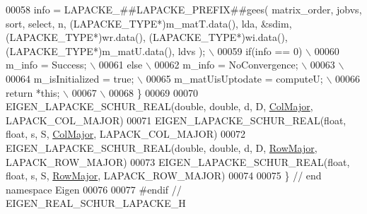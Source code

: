 \begin{DoxyCode}
00058 \textcolor{preprocessor}{  info = LAPACKE\_##LAPACKE\_PREFIX##gees( matrix\_order, jobvs, sort, select, n,
       (LAPACKE\_TYPE*)m\_matT.data(), lda, &sdim, (LAPACKE\_TYPE*)wr.data(), (LAPACKE\_TYPE*)wi.data(), (LAPACKE\_TYPE*)m\_matU.data(), ldvs ); \(\backslash\)}
00059 \textcolor{preprocessor}{  if(info == 0) \(\backslash\)}
00060 \textcolor{preprocessor}{    m\_info = Success; \(\backslash\)}
00061 \textcolor{preprocessor}{  else \(\backslash\)}
00062 \textcolor{preprocessor}{    m\_info = NoConvergence; \(\backslash\)}
00063 \textcolor{preprocessor}{\(\backslash\)}
00064 \textcolor{preprocessor}{  m\_isInitialized = true; \(\backslash\)}
00065 \textcolor{preprocessor}{  m\_matUisUptodate = computeU; \(\backslash\)}
00066 \textcolor{preprocessor}{  return *this; \(\backslash\)}
00067 \textcolor{preprocessor}{\(\backslash\)}
00068 \textcolor{preprocessor}{\}}
00069 
00070 EIGEN\_LAPACKE\_SCHUR\_REAL(\textcolor{keywordtype}{double},   \textcolor{keywordtype}{double}, d, D, \hyperlink{group__enums_ggaacded1a18ae58b0f554751f6cdf9eb13a0cbd4bdd0abcfc0224c5fcb5e4f6669a}{ColMajor}, LAPACK\_COL\_MAJOR)
00071 EIGEN\_LAPACKE\_SCHUR\_REAL(\textcolor{keywordtype}{float},    \textcolor{keywordtype}{float},  s, S, \hyperlink{group__enums_ggaacded1a18ae58b0f554751f6cdf9eb13a0cbd4bdd0abcfc0224c5fcb5e4f6669a}{ColMajor}, LAPACK\_COL\_MAJOR)
00072 EIGEN\_LAPACKE\_SCHUR\_REAL(\textcolor{keywordtype}{double},   \textcolor{keywordtype}{double}, d, D, \hyperlink{group__enums_ggaacded1a18ae58b0f554751f6cdf9eb13acfcde9cd8677c5f7caf6bd603666aae3}{RowMajor}, LAPACK\_ROW\_MAJOR)
00073 EIGEN\_LAPACKE\_SCHUR\_REAL(\textcolor{keywordtype}{float},    \textcolor{keywordtype}{float},  s, S, \hyperlink{group__enums_ggaacded1a18ae58b0f554751f6cdf9eb13acfcde9cd8677c5f7caf6bd603666aae3}{RowMajor}, LAPACK\_ROW\_MAJOR)
00074 
00075 \} \textcolor{comment}{// end namespace Eigen}
00076 
00077 \textcolor{preprocessor}{#endif // EIGEN\_REAL\_SCHUR\_LAPACKE\_H}
\end{DoxyCode}
